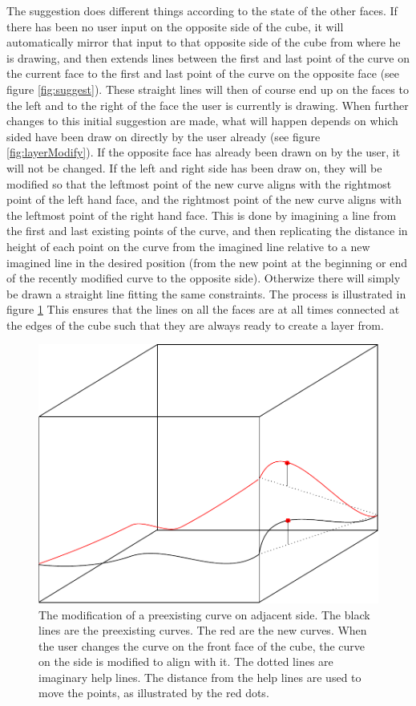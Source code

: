 \documentclass[a4paper,12pt]{report}
\begin{document}
The suggestion does different things according to the state of the other faces. If there has been no user input on the opposite side of the cube, it will automatically mirror that input to that opposite side of the cube from where he is drawing, and then extends lines between the first and last point of the curve on the current face to the first and last point of the curve on the opposite face (see figure \ref{fig:suggest}). These straight lines will then of course end up on the faces to the left and to the right of the face the user is currently is drawing. When further changes to this initial suggestion are made, what will happen depends on which sided have been draw on directly by the user already (see figure \ref{fig:layerModify}). If the opposite face has already been drawn on by the user, it will not be changed. If the left and right side has been draw on, they will be modified so that the leftmost point of the new curve aligns with the rightmost point of the left hand face, and the rightmost point of the new curve aligns with the leftmost point of the right hand face.
 This is done by imagining a line from the first and last existing points of the curve, and then replicating the distance in height of each point on the curve from the imagined line relative to a new imagined line in the desired position (from the new point at the beginning or end of the recently modified curve to the opposite side). Otherwize there will simply be drawn a straight line fitting the same 
constraints. The process is illustrated in figure \ref{fig:changeSide} This ensures that the lines on all the faces are at all times connected at the edges of the cube such that they are always ready to create a layer from.

\begin{figure}
\centering
\includegraphics[width=.8\linewidth]{thesis/changeSide.pdf}
 \caption{The modification of a preexisting curve on adjacent side. The black lines are the preexisting curves. The red are the new curves. When the user changes the curve on the front face of the cube, the curve on the side is modified to align with it. The dotted lines are imaginary help lines. The distance from the help lines are used to move the points, as illustrated by the red dots.}
 \label{fig:changeSide}
\end{figure}
\end{document}

